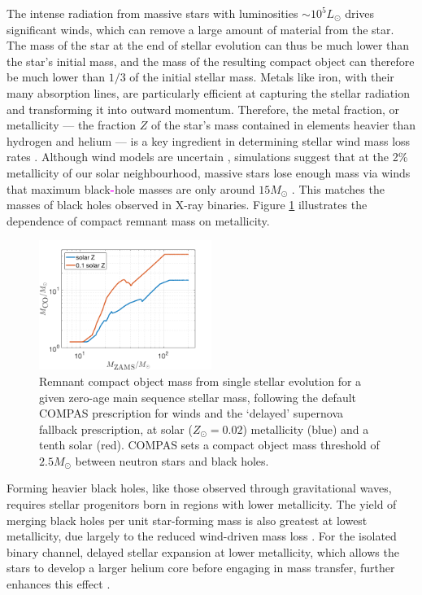 \documentclass[review]{elsarticle}
\newcommand{\ilya}[1]{\textcolor{magenta}{\bf{#1}}}
\begin{document}
The intense radiation from massive stars with luminosities $\sim 10^5 L_\odot$ drives significant winds, which can remove a large amount of material from the star. The mass of the star at the end of stellar evolution can thus be much lower than the star's initial mass, and the mass of the resulting compact object can therefore be much lower than $1/3$ of the initial stellar mass. Metals like iron, with their many absorption lines, are particularly efficient at capturing the stellar radiation and transforming it into outward momentum.  Therefore, the metal fraction, or metallicity  --- the fraction $Z$ of the star's mass contained in elements heavier than hydrogen and helium --- is a key ingredient in determining stellar wind mass loss rates \citep{Vink:2001}. Although wind models are uncertain \citep[e.g.,][]{Renzo:2017}, simulations suggest that at the 2\% metallicity of our solar neighbourhood, massive stars lose enough mass via winds that maximum black\ilya{-}hole masses are only around $15 M_\odot$ \citep{Belczynski:2009,Spera:2015}. This matches the masses of black holes observed in X-ray binaries. Figure \ref{fig:BHremnant} illustrates the dependence of compact remnant mass on metallicity. 
 
\begin{figure}
	\centering
	\includegraphics[width=0.5\textwidth]{BHremnantdelayed.png}
	\caption{\label{fig:BHremnant} Remnant compact object mass from single stellar evolution for a given zero-age main sequence stellar mass, following the default COMPAS prescription for winds \citep{Stevenson:2017}  and the `delayed' \citet{Fryer:2012} supernova fallback prescription, at solar ($Z_\odot=0.02$) metallicity (blue) and a tenth solar (red).  COMPAS sets a compact object mass threshold of $2.5 M_\odot$ between neutron stars and black holes.
	} 
\end{figure}

Forming heavier black holes, like those observed through gravitational waves, requires stellar progenitors born in regions with lower metallicity. The yield of merging black holes per unit star-forming mass is also greatest at lowest metallicity, due largely to the reduced wind-driven mass loss \citep[e.g.,][]{Belczynski:2010,Kruckow:2018}. For the isolated binary channel, delayed stellar expansion at lower metallicity, which allows the stars to develop a larger helium core before engaging in mass transfer, further enhances this effect \citep[e.g.,][]{Stevenson:2017}.
\end{document}
